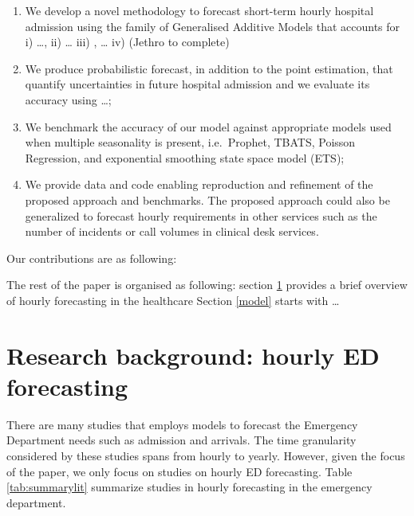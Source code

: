 \documentclass[]{elsarticle} %
\begin{document}
\begin{enumerate}
\def\labelenumi{\arabic{enumi}.}
\item
  We develop a novel methodology to forecast short-term hourly hospital admission using the family of Generalised Additive Models that accounts for i) \ldots, ii) \ldots{} iii) , \ldots{} iv) (Jethro to complete)
\item
  We produce probabilistic forecast, in addition to the point estimation, that quantify uncertainties in future hospital admission and we evaluate its accuracy using \ldots;
\item
  We benchmark the accuracy of our model against appropriate models used when multiple seasonality is present, i.e.~Prophet, TBATS, Poisson Regression, and exponential smoothing state space model (ETS);
\item
  We provide data and code enabling reproduction and refinement of the proposed approach and benchmarks. The proposed approach could also be generalized to forecast hourly requirements in other services such as the number of incidents or call volumes in clinical desk services.
\end{enumerate}

Our contributions are as following:

The rest of the paper is organised as following: section \ref{lit} provides a brief overview of hourly forecasting in the healthcare Section \ref{model} starts with \ldots{}

\hypertarget{lit}{%
\section{Research background: hourly ED forecasting}\label{lit}}

There are many studies that employs models to forecast the Emergency Department needs such as admission and arrivals. The time granularity considered by these studies spans from hourly to yearly. However, given the focus of the paper, we only focus on studies on hourly ED forecasting. Table \ref{tab:summarylit} summarize studies in hourly forecasting in the emergency department.
\end{document}
